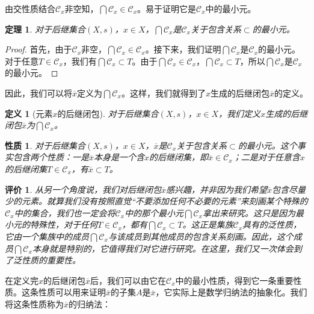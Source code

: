 \documentclass[oneside, 12pt]{ctexart}
\newtheorem{definition}{定义}[section]
\newtheorem{property}{性质}[section]
\newtheorem{theorem}{定理}[section]
\newtheorem{remark}{评价}[section]
\begin{document}
由交性质结合$\mathcal{C}_x$非空知，$\bigcap\mathcal{C}_x \in \mathcal{C}_x$。易于证明它是$\mathcal{C}_x$中的最小元。

\begin{theorem}
	对于后继集合$(X, s)$，$x \in X$，$\bigcap\mathcal{C}_x$是$\mathcal{C}_x$关于包含关系$\subset$的最小元。
\end{theorem}

\begin{proof}
	首先，由于$\mathcal{C}_x$非空，$\bigcap\mathcal{C}_x \in \mathcal{C}_x$。接下来，我们证明$\bigcap\mathcal{C}_x$是$\mathcal{C}_x$的最小元。对于任意$T \in \mathcal{C}_x$，我们有$\bigcap\mathcal{C}_x \subset T$。由于$\bigcap\mathcal{C}_x \in \mathcal{C}_x$，$\bigcap\mathcal{C}_x \subset T$，所以$\bigcap\mathcal{C}_x$是$\mathcal{C}_x$的最小元。
\end{proof}

因此，我们可以将$\overline{x}$定义为$\bigcap\mathcal{C}_x$。这样，我们就得到了$x$生成的后继闭包$\overline{x}$的定义。

\begin{definition}[元素$x$的后继闭包]
	对于后继集合$(X, s)$，$x \in X$，我们定义$x$生成的后继闭包$\overline{x}$为$\bigcap\mathcal{C}_x$。
\end{definition}

\begin{property}
	对于后继集合$(X, s)$，$x \in X$，$\overline{x}$是$\mathcal{C}_x$关于包含关系$\subset$的最小元。这个事实包含两个性质：一是$\overline{x}$本身是一个含$x$的后继闭集，即$\overline{x} \in \mathcal{C}_x$；二是对于任意含$x$的后继闭集$T \in \mathcal{C}_x$，有$\overline{x} \subset T$。
\end{property}

\begin{remark}
从另一个角度说，我们对后继闭包$\overline{x}$感兴趣，并非因为我们希望$\overline{x}$包含尽量少的元素。就算我们没有按照直觉“不要添加任何不必要的元素”来刻画某个特殊的$\mathcal{C}_x$中的集合，我们也一定会将$\mathcal{C}_x$中的那个最小元$\bigcap\mathcal{C}_x$拿出来研究。这只是因为最小元的特殊性，对于任何$T \in \mathcal{C}_x$，都有$\bigcap\mathcal{C}_x \subset T$。这正是集族$\mathcal{C}_x$具有的泛性质，它由一个集族中的成员$\bigcap\mathcal{C}_x$与该成员到其他成员的包含关系刻画。因此，这个成员$\bigcap\mathcal{C}_x$本身就是特别的，它值得我们对它进行研究。在这里，我们又一次体会到了泛性质的重要性。
\end{remark}

在定义完$x$的后继闭包$\overline{x}$后，我们可以由它在$\mathcal{C}_x$中的最小性质，得到它一条重要性质。这条性质可以用来证明$\overline{x}$的子集$A$是$\overline{x}$，它实际上是数学归纳法的抽象化。我们将这条性质称为$\overline{x}$的归纳法：
\end{document}
